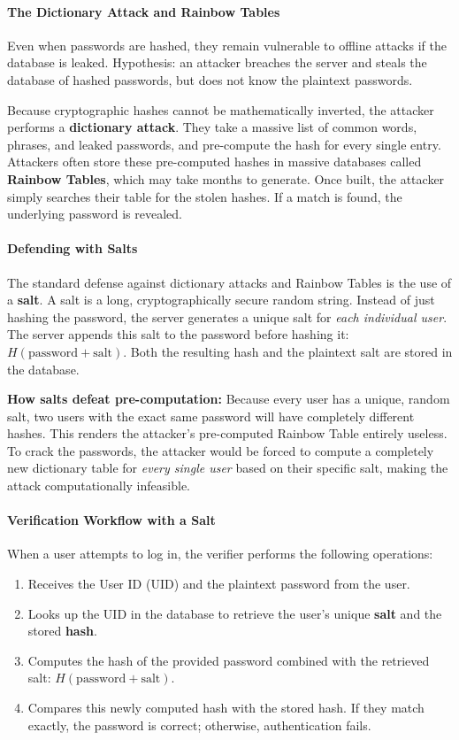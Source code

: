 \paragraph{The Dictionary Attack and Rainbow Tables}
Even when passwords are hashed, they remain vulnerable to offline attacks if the database is leaked. Hypothesis: an attacker breaches the server and steals the database of hashed passwords, but does not know the plaintext passwords.

Because cryptographic hashes cannot be mathematically inverted, the attacker performs a \textbf{dictionary attack}. They take a massive list of common words, phrases, and leaked passwords, and pre-compute the hash for every single entry. Attackers often store these pre-computed hashes in massive databases called \textbf{Rainbow Tables}, which may take months to generate. Once built, the attacker simply searches their table for the stolen hashes. If a match is found, the underlying password is revealed.

\paragraph{Defending with Salts}
The standard defense against dictionary attacks and Rainbow Tables is the use of a \textbf{salt}. A salt is a long, cryptographically secure random string. Instead of just hashing the password, the server generates a unique salt for \textit{each individual user}. The server appends this salt to the password before hashing it: $H(\text{password} + \text{salt})$. Both the resulting hash and the plaintext salt are stored in the database.

\textbf{How salts defeat pre-computation:} Because every user has a unique, random salt, two users with the exact same password will have completely different hashes. This renders the attacker's pre-computed Rainbow Table entirely useless. To crack the passwords, the attacker would be forced to compute a completely new dictionary table for \textit{every single user} based on their specific salt, making the attack computationally infeasible.

\paragraph{Verification Workflow with a Salt}
When a user attempts to log in, the verifier performs the following operations:
\begin{enumerate}
    \item Receives the User ID (UID) and the plaintext password from the user.
    \item Looks up the UID in the database to retrieve the user's unique \textbf{salt} and the stored \textbf{hash}.
    \item Computes the hash of the provided password combined with the retrieved salt: $H(\text{password} + \text{salt})$.
    \item Compares this newly computed hash with the stored hash. If they match exactly, the password is correct; otherwise, authentication fails.
\end{enumerate}


